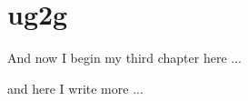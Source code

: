 \chapter{ug2g}
\ifpdf
    \graphicspath{{Chapter3/Chapter3Figs/PNG/}{Chapter3/Chapter3Figs/PDF/}{Chapter3/Chapter3Figs/}}
\else
    \graphicspath{{Chapter3/Chapter3Figs/EPS/}{Chapter3/Chapter3Figs/}}
\fi

\Section

And now I begin my third chapter here ...

and here I write more ...



